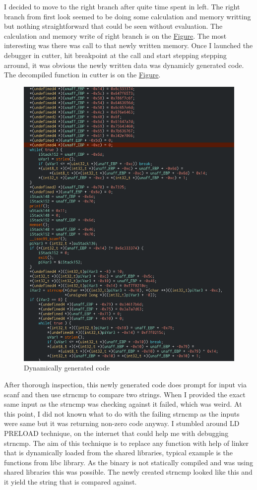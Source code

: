 \documentclass[11pt]{article}
\begin{document}
I decided to move to the right branch after quite time spent in left. The right branch from first look seemed to be doing some calculation and memory writting but nothing straightforward that could be seen without evaluation.
The calculation and memory write of right branch is on the \hyperref[fig-main-branches]{Figure}. The most interesting was there was call to that newly written memory. Once I launched the debugger in cutter, hit breakpoint at the call and start stepping stepping arround, it was obvious the newly written data was dynamicly generated code. The decompiled function in cutter is on the \hyperref[fig-dynamic]{Figure}.
\begin{figure}[htbp]
\centering
\includegraphics[width=.9\linewidth]{boms_landed_new_function.png}
\caption{\label{fig-dynamic}Dynamically generated code}
\end{figure}

After thorough inspection, this newly generated code does prompt for input via scanf and then use strncmp to compare two strings. When I provided the exact same input as the strncmp was checking against it failed, which was weird. At this point, I did not known what to do with the failing strncmp as the inputs were same but it was returning non-zero code anyway. I stumbled around LD PRELOAD technique, on the internet that could help me with debugging strncmp.
The aim of this technique is to replace any function with help of linker that is dynamically loaded from the shared libraries, typical example is the functions from libc library. As the binary is not statically compiled and was using shared libraries this was possible.
The newly created strncmp looked like this and it yield the string that is compared against.
\end{document}
